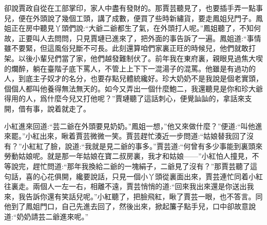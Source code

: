 \begin{parag}
    卻說賈政自從在工部掌印，家人中盡有發財的。那賈芸聽見了，也要插手弄一點事兒，便在外頭說了幾個工頭，講了成數，便買了些時新繡貨，要走鳳姐兒門子。鳳姐正在房中聽見丫頭們說:“大爺二爺都生了氣，在外頭打人呢。”鳳姐聽了，不知何故，正要叫人去問問，只見賈璉已進來了，把外面的事告訴了一遍。鳳姐道:“事情雖不要緊，但這風俗兒斷不可長。此刻還算咱們家裏正旺的時候兒，他們就敢打架。以後小輩兒們當了家，他們越發難制伏了。前年我在東府裏，親眼見過焦大喫的爛醉，躺在臺階子底下罵人，不管上上下下一混湯子的混罵。他雖是有過功的人，到底主子奴才的名分，也要存點兒體統纔好。珍大奶奶不是我說是個老實頭，個個人都叫他養得無法無天的。如今又弄出一個什麼鮑二，我還聽見是你和珍大爺得用的人，爲什麼今兒又打他呢？”賈璉聽了這話刺心，便覺訕訕的，拿話來支開，借有事，說着就走了。
\end{parag}


\begin{parag}
    小紅進來回道:“芸二爺在外頭要見奶奶。”鳳姐一想，”他又來做什麼？”便道:“叫他進來罷。”小紅出來，瞅着賈芸微微一笑。賈芸趕忙湊近一步問道:“姑娘替我回了沒有？”小紅紅了臉，說道:“我就是見二爺的事多。”賈芸道:“何曾有多少事能到裏頭來勞動姑娘呢。就是那一年姑娘在寶二叔房裏，我才和姑娘——”小紅怕人撞見，不等說完，趕忙問道:“那年我換給二爺的一塊絹子，二爺見了沒有？”那賈芸聽了這句話，喜的心花俱開，纔要說話，只見一個小丫頭從裏面出來，賈芸連忙同着小紅往裏走。兩個人一左一右，相離不遠，賈芸悄悄的道:“回來我出來還是你送出我來，我告訴你還有笑話兒呢。”小紅聽了，把臉飛紅，瞅了賈芸一眼，也不答言。同他到了鳳姐門口，自己先進去回了，然後出來，掀起簾子點手兒，口中卻故意說道:“奶奶請芸二爺進來呢。”
\end{parag}


